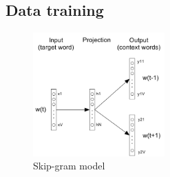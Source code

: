 \documentclass[Journal, InsideFigs, DoubleSpace]{ascelike} %
\begin{document}
\subsection{Data training}

\begin{figure}[t]
	\centering
	\includegraphics[width=0.45\textwidth]{skip-gram-model}
	\caption{Skip-gram model}
	\label{fig:skip-gram}
\end{figure}
\end{document}
